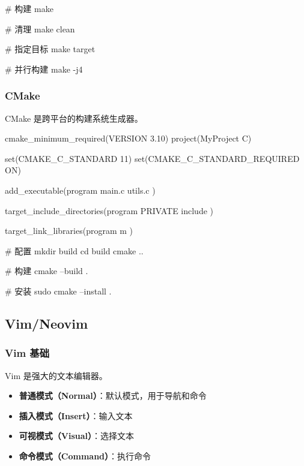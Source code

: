
\begin{lstcode}[numbers=none]
  # 构建
  make

  # 清理
  make clean

  # 指定目标
  make target

  # 并行构建
  make -j4
\end{lstcode}

\subsubsection{CMake}

CMake 是跨平台的构建系统生成器。


\begin{lstcode}[numbers=none]
cmake_minimum_required(VERSION 3.10)
project(MyProject C)

set(CMAKE_C_STANDARD 11)
set(CMAKE_C_STANDARD_REQUIRED ON)

add_executable(program
    main.c
    utils.c
)

target_include_directories(program PRIVATE
    include
)

target_link_libraries(program
    m
)
\end{lstcode}


\begin{lstcode}[numbers=none]
  # 配置
  mkdir build
  cd build
  cmake ..

  # 构建
  cmake --build .

  # 安装
  sudo cmake --install .
\end{lstcode}

\subsection{Vim/Neovim}

\subsubsection{Vim 基础}

Vim 是强大的文本编辑器。


\begin{itemize}
  \item \textbf{普通模式（Normal）}：默认模式，用于导航和命令
  \item \textbf{插入模式（Insert）}：输入文本
  \item \textbf{可视模式（Visual）}：选择文本
  \item \textbf{命令模式（Command）}：执行命令
\end{itemize}

